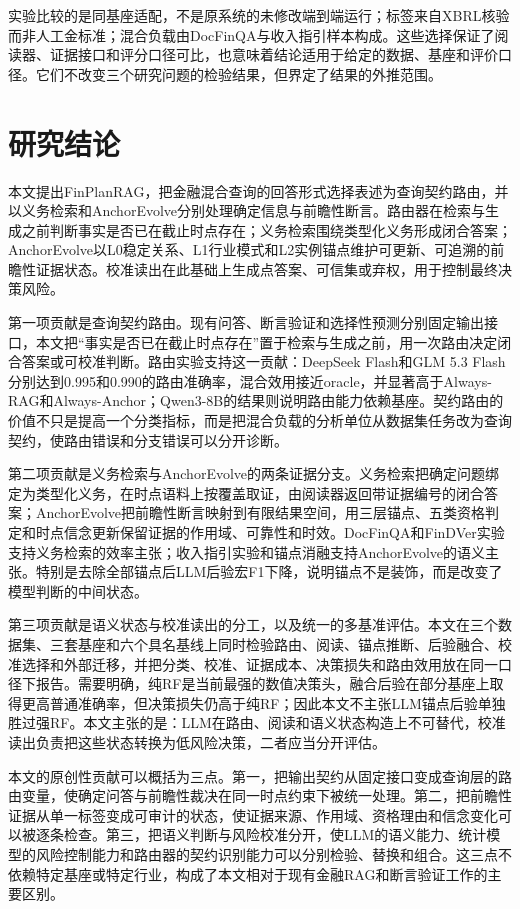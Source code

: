 实验比较的是同基座适配，不是原系统的未修改端到端运行；标签来自XBRL核验而非人工金标准；混合负载由DocFinQA与收入指引样本构成。这些选择保证了阅读器、证据接口和评分口径可比，也意味着结论适用于给定的数据、基座和评价口径。它们不改变三个研究问题的检验结果，但界定了结果的外推范围。

\section{研究结论}

本文提出FinPlanRAG，把金融混合查询的回答形式选择表述为查询契约路由，并以义务检索和AnchorEvolve分别处理确定信息与前瞻性断言。路由器在检索与生成之前判断事实是否已在截止时点存在；义务检索围绕类型化义务形成闭合答案；AnchorEvolve以L0稳定关系、L1行业模式和L2实例锚点维护可更新、可追溯的前瞻性证据状态。校准读出在此基础上生成点答案、可信集或弃权，用于控制最终决策风险。

第一项贡献是查询契约路由。现有问答、断言验证和选择性预测分别固定输出接口，本文把“事实是否已在截止时点存在”置于检索与生成之前，用一次路由决定闭合答案或可校准判断。路由实验支持这一贡献：DeepSeek Flash和GLM 5.3 Flash分别达到0.995和0.990的路由准确率，混合效用接近oracle，并显著高于Always-RAG和Always-Anchor；Qwen3-8B的结果则说明路由能力依赖基座。契约路由的价值不只是提高一个分类指标，而是把混合负载的分析单位从数据集任务改为查询契约，使路由错误和分支错误可以分开诊断。

第二项贡献是义务检索与AnchorEvolve的两条证据分支。义务检索把确定问题绑定为类型化义务，在时点语料上按覆盖取证，由阅读器返回带证据编号的闭合答案；AnchorEvolve把前瞻性断言映射到有限结果空间，用三层锚点、五类资格判定和时点信念更新保留证据的作用域、可靠性和时效。DocFinQA和FinDVer实验支持义务检索的效率主张；收入指引实验和锚点消融支持AnchorEvolve的语义主张。特别是去除全部锚点后LLM后验宏F1下降，说明锚点不是装饰，而是改变了模型判断的中间状态。

第三项贡献是语义状态与校准读出的分工，以及统一的多基准评估。本文在三个数据集、三套基座和六个具名基线上同时检验路由、阅读、锚点推断、后验融合、校准选择和外部迁移，并把分类、校准、证据成本、决策损失和路由效用放在同一口径下报告。需要明确，纯RF是当前最强的数值决策头，融合后验在部分基座上取得更高普通准确率，但决策损失仍高于纯RF；因此本文不主张LLM锚点后验单独胜过强RF。本文主张的是：LLM在路由、阅读和语义状态构造上不可替代，校准读出负责把这些状态转换为低风险决策，二者应当分开评估。

本文的原创性贡献可以概括为三点。第一，把输出契约从固定接口变成查询层的路由变量，使确定问答与前瞻性裁决在同一时点约束下被统一处理。第二，把前瞻性证据从单一标签变成可审计的状态，使证据来源、作用域、资格理由和信念变化可以被逐条检查。第三，把语义判断与风险校准分开，使LLM的语义能力、统计模型的风险控制能力和路由器的契约识别能力可以分别检验、替换和组合。这三点不依赖特定基座或特定行业，构成了本文相对于现有金融RAG和断言验证工作的主要区别。

